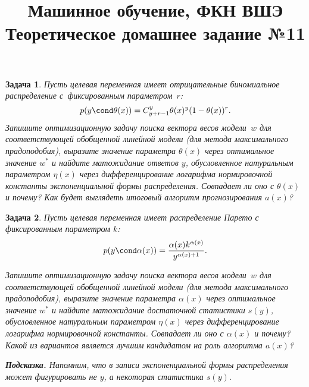 \documentclass[12pt,fleqn]{article}
\title{Машинное обучение, ФКН ВШЭ\\Теоретическое домашнее задание №11}
\author{}
\date{}
\newtheorem{esProblem}{Задача}
\begin{document}
\maketitle

\begin{esProblem}
	Пусть целевая переменная имеет отрицательные биномиальное распределение с~фиксированным параметром~$r$:
	$$p(y \cond \theta(x)) = C_{y + r - 1}^y \theta(x)^y (1-\theta(x))^r.$$
	Запишите оптимизационную задачу поиска вектора весов модели~$w$ для соответствующей обобщенной линейной модели (для метода максимального прадоподобия), выразите значение параметра $\theta(x)$ через оптимальное значение $w^*$ и найдите матожидание ответов $y$, обусловленное натуральным параметром $\eta(x)$ через дифференцирование логарифма нормировочной константы экспоненциальной формы распределения. Совпадает ли оно с $\theta(x)$ и почему? Как будет выглядеть итоговый алгоритм прогнозирования $a(x)$?
\end{esProblem}

\begin{esProblem}
	Пусть целевая переменная имеет распределение Парето с фиксированным параметром $k$:
	$$p(y \cond \alpha(x)) = \frac{\alpha(x) k^{\alpha(x)}}{y^{\alpha(x) + 1}}.$$
	
	Запишите оптимизационную задачу поиска вектора весов модели~$w$ для соответствующей обобщенной линейной модели (для метода максимального прадоподобия), выразите значение параметра $\alpha(x)$ через оптимальное значение $w^*$ и найдите матожидание достаточной статистики $s(y)$, обусловленное натуральным параметром $\eta(x)$ через дифференцирование логарифма нормировочной константы. Совпадает ли оно с $\alpha(x)$ и почему? Какой из вариантов является лучшим кандидатом на роль алгоритма $a(x)$?
	
	\textbf{Подсказка.} Напомним, что в записи экспоненциальной формы распределения может фигурировать не $y$, а некоторая статистика $s(y)$.
\end{esProblem}
\end{document}
